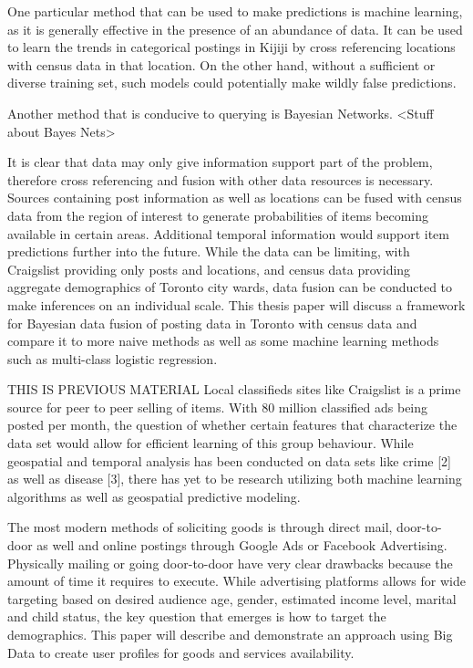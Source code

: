 \documentclass[12pt]{article}
\begin{document}
One particular method that can be used to make predictions is machine learning, as it is generally effective in the presence of an abundance of data. It can be used to learn the trends in categorical postings in Kijiji by cross referencing locations with census data in that location. On the other hand, without a sufficient or diverse training set, such models could potentially make wildly false predictions.

Another method that is conducive to querying is Bayesian Networks. <Stuff about Bayes Nets>

It is clear that data may only give information support part of the problem, therefore cross referencing and fusion with other data resources is necessary. Sources containing post information as well as locations can be fused with census data from the region of interest to generate probabilities of items becoming available in certain areas. Additional temporal information would support item predictions further into the future. While the data can be limiting, with Craigslist providing only posts and locations, and census data providing aggregate demographics of Toronto city wards, data fusion can be conducted to make inferences on an individual scale. This thesis paper will discuss a framework for Bayesian data fusion of posting data in Toronto with census data and compare it to more naive methods as well as some machine learning methods such as multi-class logistic regression. 



   THIS IS PREVIOUS MATERIAL
   Local classifieds sites like Craigslist is a prime source for peer to peer selling of items. With 80 million classified ads being posted per month\cite{clfs}, the question of whether certain features that characterize the data set would allow for efficient learning of this group behaviour. While geospatial and temporal analysis has been conducted on data sets like crime [2] as well as disease [3], there has yet to be research utilizing both machine learning algorithms as well as geospatial predictive modeling. 

   The most modern methods of soliciting goods is through direct mail, door-to-door as well and online postings through Google Ads or Facebook Advertising. Physically mailing or going door-to-door have very clear drawbacks because the amount of time it requires to execute. While advertising platforms allows for wide targeting based on desired audience age, gender, estimated income level, marital and child status, the key question that emerges is how to target the demographics. This paper will describe and demonstrate an approach using Big Data to create user profiles for goods and services availability. 
\end{document}
